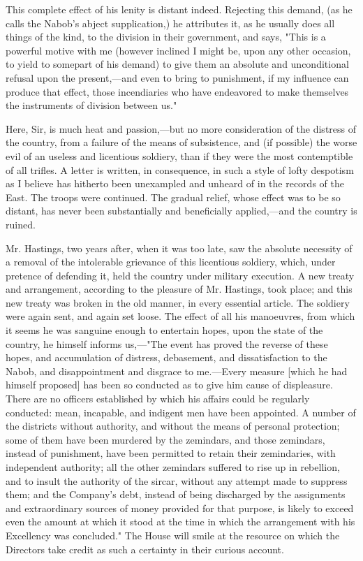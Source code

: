 This complete effect of his lenity is distant indeed. Rejecting this demand, (as he calls the Nabob's abject supplication,) he attributes it, as he usually does all things of the kind, to the division in their government, and says, "This is a powerful motive with me (however inclined I might be, upon any other occasion, to yield to somepart of his demand) to give them an absolute and unconditional refusal upon the present,—and even to bring to punishment, if my influence can produce that effect, those incendiaries who have endeavored to make themselves the instruments of division between us."

Here, Sir, is much heat and passion,—but no more consideration of the distress of the country, from a failure of the means of subsistence, and (if possible) the worse evil of an useless and licentious soldiery, than if they were the most contemptible of all trifles. A letter is written, in consequence, in such a style of lofty despotism as I believe has hitherto been unexampled and unheard of in the records of the East. The troops were continued. The gradual relief, whose effect was to be so distant, has never been substantially and beneficially applied,—and the country is ruined.

Mr. Hastings, two years after, when it was too late, saw the absolute necessity of a removal of the intolerable grievance of this licentious soldiery, which, under pretence of defending it, held the country under military execution. A new treaty and arrangement, according to the pleasure of Mr. Hastings, took place; and this new treaty was broken in the old manner, in every essential article. The soldiery were again sent, and again set loose. The effect of all his manoeuvres, from which it seems he was sanguine enough to entertain hopes, upon the state of the country, he himself informs us,—"The event has proved the reverse of these hopes, and accumulation of distress, debasement, and dissatisfaction to the Nabob, and disappointment and disgrace to me.—Every measure [which he had himself proposed] has been so conducted as to give him cause of displeasure. There are no officers established by which his affairs could be regularly conducted: mean, incapable, and indigent men have been appointed. A number of the districts without authority, and without the means of personal protection; some of them have been murdered by the zemindars, and those zemindars, instead of punishment, have been permitted to retain their zemindaries, with independent authority; all the other zemindars suffered to rise up in rebellion, and to insult the authority of the sircar, without any attempt made to suppress them; and the Company's debt, instead of being discharged by the assignments and extraordinary sources of money provided for that purpose, is likely to exceed even the amount at which it stood at the time in which the arrangement with his Excellency was concluded." The House will smile at the resource on which the Directors take credit as such a certainty in their curious account.

